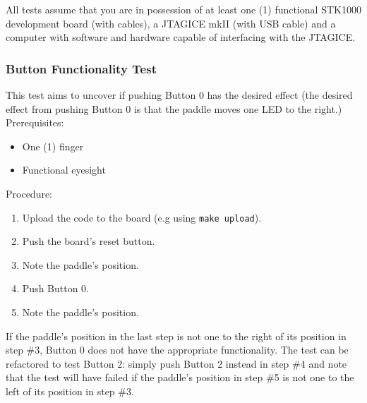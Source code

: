 All tests assume that you are in possession of at least one (1) functional STK1000 development board (with cables), a JTAGICE mkII (with USB cable) and a computer with software and hardware capable of interfacing with the JTAGICE.
\subsubsection{Button Functionality Test}
This test aims to uncover if pushing Button 0 has the desired effect (the desired effect from pushing Button 0 is that the paddle moves one LED to the right.)
\\ Prerequisites:
\begin{itemize}
	\item One (1) finger
	\item Functional eyesight
\end{itemize}
Procedure:
\begin{enumerate}
	\item Upload the code to the board (e.g using \texttt{make upload}).
	\item Push the board's reset button.
	\item Note the paddle's position.
	\item Push Button 0.
	\item Note the paddle's position.
\end{enumerate}
If the paddle's position in the last step is not one to the right of its position in step \#3, Button 0 does not have the appropriate functionality.
The test can be refactored to test Button 2: simply push Button 2 instead in step \#4 and note that the test will have failed if the paddle's position in step \#5 is not one to the left of its position in step \#3.

